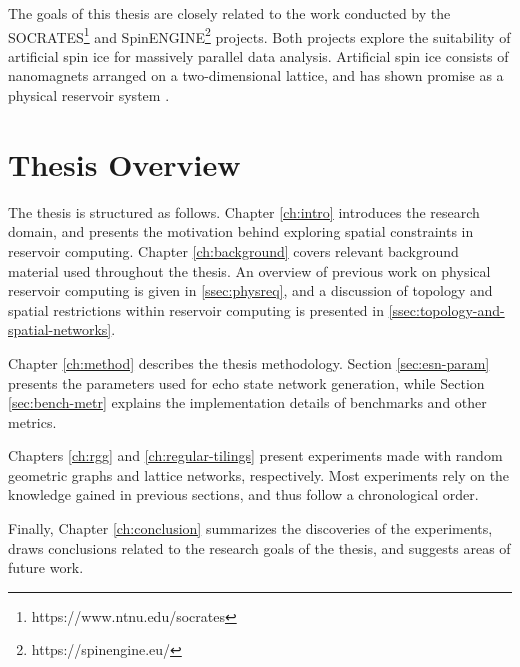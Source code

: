 The goals of this thesis are closely related to the work conducted by the
SOCRATES\footnote{https://www.ntnu.edu/socrates} and
SpinENGINE\footnote{https://spinengine.eu/} projects. Both projects explore the
suitability of artificial spin ice for massively parallel data
analysis. Artificial spin ice consists of nanomagnets arranged on a
two-dimensional lattice, and has shown promise as a physical reservoir system
\cite{jensen_computation_2018, jensen_reservoir_2020}.

\section{Thesis Overview}

The thesis is structured as follows. Chapter \ref{ch:intro} introduces the
research domain, and presents the motivation behind exploring spatial
constraints in reservoir computing. Chapter \ref{ch:background} covers relevant
background material used throughout the thesis. An overview of previous work on
physical reservoir computing is given in \ref{ssec:physreq}, and a discussion of
topology and spatial restrictions within reservoir computing is presented in
\ref{ssec:topology-and-spatial-networks}.

Chapter \ref{ch:method} describes the thesis methodology. Section
\ref{sec:esn-param} presents the parameters used for echo state network
generation, while Section \ref{sec:bench-metr} explains the implementation
details of benchmarks and other metrics.

Chapters \ref{ch:rgg} and \ref{ch:regular-tilings} present experiments made with
random geometric graphs and lattice networks, respectively. Most experiments
rely on the knowledge gained in previous sections, and thus follow a
chronological order.

Finally, Chapter \ref{ch:conclusion} summarizes the discoveries of the
experiments, draws conclusions related to the research goals of the thesis, and
suggests areas of future work.

